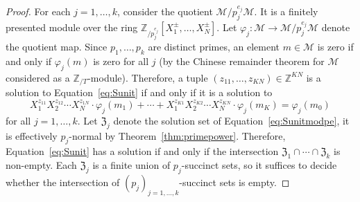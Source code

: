 \documentclass[letterpaper, 11pt, thm-restate]{article}
\numberwithin{equation}{section}
\newcommand{\Z}{\mathbb{Z}}
\newcommand{\ZT}{\mathbb{Z}_{/T}}
\newcommand{\mM}{\mathcal{M}}
\newcommand{\mZ}{\mathfrak{Z}}
\theoremstyle{definition}
\theoremstyle{definition}
\theoremstyle{definition}
\begin{document}
\begin{proof}
    For each $j = 1, \ldots, k$, consider the quotient $\mM/p_j^{e_j} \mM$.
    It is a finitely presented module over the ring $\Z_{/p_j^{e_j}}[X_1^{\pm}, \ldots, X_N^{\pm}]$. 
    Let $\varphi_j \colon \mM \rightarrow \mM/p_j^{e_j} \mM$ denote the quotient map.
    Since $p_1, \ldots, p_k$ are distinct primes, an element $m \in \mM$ is zero if and only if $\varphi_j(m)$ is zero for all $j$ (by the Chinese remainder theorem for $\mM$ considered as a $\ZT$-module).
    Therefore, a tuple $(z_{11}, \ldots, z_{KN}) \in \Z^{KN}$ is a solution to Equation~\eqref{eq:Sunit} if and only if it is a solution to
    \begin{equation}\label{eq:Sunitmodpe}
        X_1^{z_{11}} X_2^{z_{12}} \cdots X_N^{z_{1N}} \cdot \varphi_j(m_1) + \cdots + X_1^{z_{K1}} X_2^{z_{K2}} \cdots X_N^{z_{KN}} \cdot \varphi_j(m_K) = \varphi_j(m_0)
    \end{equation}
    for all $j = 1, \ldots, k$.
    Let $\mZ_j$ denote the solution set of Equation~\eqref{eq:Sunitmodpe}, it is effectively $p_j$-normal by Theorem~\ref{thm:primepower}.
    Therefore, Equation~\eqref{eq:Sunit} has a solution if and only if the intersection $\mZ_1 \cap \cdots \cap \mZ_k$ is non-empty.
    Each $\mZ_j$ is a finite union of $p_j$-succinct sets, so it suffices to decide whether the intersection of $(p_j)_{j=1, \ldots, k}$-succinct sets is empty.
    

\end{proof}
\end{document}
